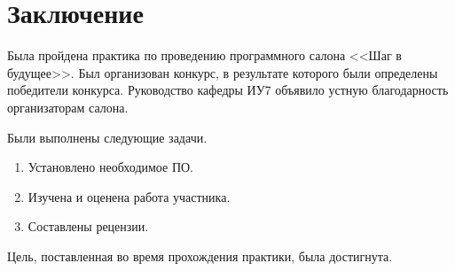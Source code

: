 \documentclass[12pt]{report}
\begin{document}
\begin{figure}[ht!]	
\end{figure} 

\chapter{Заключение}

Была пройдена практика по проведению программного салона <<Шаг в будущее>>.
Был организован конкурс, в результате которого были определены победители конкурса.
Руководство кафедры ИУ7 объявило устную благодарность организаторам салона.

Были выполнены следующие задачи.

\begin{enumerate}
	\item Установлено необходимое ПО.
	\item Изучена и оценена работа участника.
	\item Составлены рецензии.
\end{enumerate}


Цель, поставленная во время прохождения практики, была достигнута. 
\end{document}

